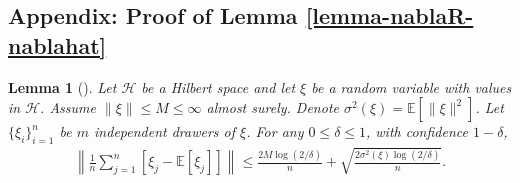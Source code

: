 \documentclass{article}
\newtheorem{lemma}{Lemma}
\begin{document}
\subsection*{Appendix: Proof of Lemma \ref{lemma-nablaR-nablahat}}
\begin{lemma}[\cite{smale2007learning}]
  \label{lem-nonequation}
    Let $\mathcal{H}$ be a Hilbert space and let $\xi$ be a random variable with values in $\mathcal{H}$.
    Assume $\|\xi\|\leq M\leq \infty$ almost surely.
    Denote $\sigma^2(\xi)=\mathbb{E}[\|\xi\|^2]$.
    Let $\{\xi_i\}_{i=1}^n$ be $m$ independent drawers of $\xi$.
    For any $0\leq \delta\leq 1$, with confidence $1-\delta$,
    \begin{align*}
      \left\|\frac{1}{n}\sum_{j=1}^n[\xi_j-\mathbb{E}[\xi_j]]\right\|\leq \frac{2M\log(2/\delta)}{n}+\sqrt{\frac{2\sigma^2(\xi)\log(2/\delta)}{n}}.
    \end{align*}
  \end{lemma}
\end{document}
